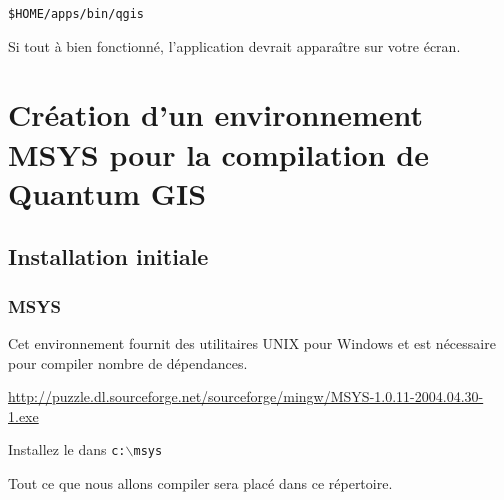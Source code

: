 \begin{verbatim}
$HOME/apps/bin/qgis 
\end{verbatim}

Si tout à bien fonctionné, l'application devrait apparaître sur votre écran.

% 
% 
% 
% 

\section{Création d'un environnement MSYS pour la compilation de Quantum GIS}
\subsection{Installation initiale}
\subsubsection{MSYS}
Cet environnement fournit des utilitaires UNIX pour Windows et est nécessaire pour compiler nombre de dépendances.

\url{
http://puzzle.dl.sourceforge.net/sourceforge/mingw/MSYS-1.0.11-2004.04.30-1.exe}

Installez le dans \texttt{c:$\backslash$msys}

Tout ce que nous allons compiler sera placé dans ce répertoire.

% 
% 
% 


